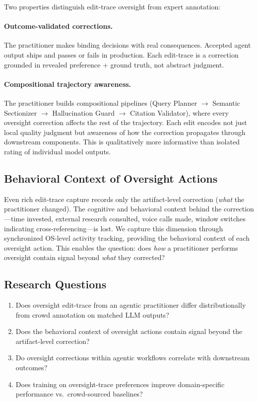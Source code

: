 \documentclass[11pt]{article}
\begin{document}
Two properties distinguish edit-trace oversight from expert annotation:

\paragraph{Outcome-validated corrections.}
The practitioner makes binding decisions with real consequences.
Accepted agent output ships and passes or fails in production.
Each edit-trace is a correction grounded in revealed preference + ground truth, not abstract judgment.

\paragraph{Compositional trajectory awareness.}
The practitioner builds compositional pipelines (Query Planner $\to$ Semantic Sectionizer $\to$ Hallucination Guard $\to$ Citation Validator), where every oversight correction affects the rest of the trajectory.
Each edit encodes not just local quality judgment but awareness of how the correction propagates through downstream components.
This is qualitatively more informative than isolated rating of individual model outputs.

\subsection{Behavioral Context of Oversight Actions}
\label{sec:behavioral-context-intro}

Even rich edit-trace capture records only the artifact-level correction (\emph{what} the practitioner changed).
The cognitive and behavioral context behind the correction---time invested, external research consulted, voice calls made, window switches indicating cross-referencing---is lost.
We capture this dimension through synchronized OS-level activity tracking, providing the behavioral context of each oversight action.
This enables the question: does \emph{how} a practitioner performs oversight contain signal beyond \emph{what} they corrected?

\subsection{Research Questions}
\label{sec:rqs}

\begin{enumerate}[label=\textbf{RQ\arabic*},leftmargin=2.5em]
  \item Does oversight edit-trace from an agentic practitioner differ distributionally from crowd annotation on matched LLM outputs?
  \item Does the behavioral context of oversight actions contain signal beyond the artifact-level correction?
  \item Do oversight corrections within agentic workflows correlate with downstream outcomes?
  \item Does training on oversight-trace preferences improve domain-specific performance vs.\ crowd-sourced baselines?
\end{enumerate}
\end{document}
